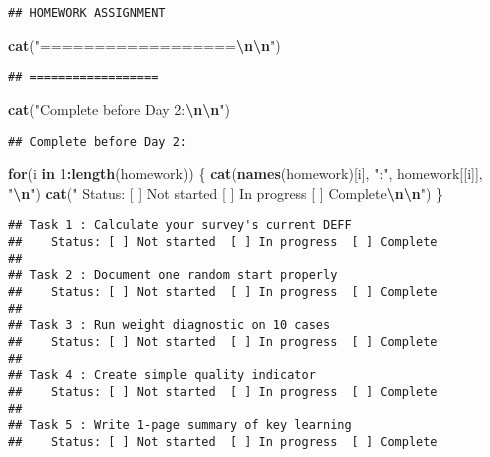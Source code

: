 \documentclass[
]{article}
\newenvironment{Shaded}{\begin{snugshade}}{\end{snugshade}}
\newcommand{\ControlFlowTok}[1]{\textcolor[rgb]{0.13,0.29,0.53}{\textbf{#1}}}
\newcommand{\DecValTok}[1]{\textcolor[rgb]{0.00,0.00,0.81}{#1}}
\newcommand{\FunctionTok}[1]{\textcolor[rgb]{0.13,0.29,0.53}{\textbf{#1}}}
\newcommand{\NormalTok}[1]{#1}
\newcommand{\SpecialCharTok}[1]{\textcolor[rgb]{0.81,0.36,0.00}{\textbf{#1}}}
\newcommand{\StringTok}[1]{\textcolor[rgb]{0.31,0.60,0.02}{#1}}
\begin{document}
\begin{verbatim}
## HOMEWORK ASSIGNMENT
\end{verbatim}

\begin{Shaded}
\begin{Highlighting}[]
\FunctionTok{cat}\NormalTok{(}\StringTok{"==================}\SpecialCharTok{\textbackslash{}n\textbackslash{}n}\StringTok{"}\NormalTok{)}
\end{Highlighting}
\end{Shaded}

\begin{verbatim}
## ==================
\end{verbatim}

\begin{Shaded}
\begin{Highlighting}[]
\FunctionTok{cat}\NormalTok{(}\StringTok{"Complete before Day 2:}\SpecialCharTok{\textbackslash{}n\textbackslash{}n}\StringTok{"}\NormalTok{)}
\end{Highlighting}
\end{Shaded}

\begin{verbatim}
## Complete before Day 2:
\end{verbatim}

\begin{Shaded}
\begin{Highlighting}[]
\ControlFlowTok{for}\NormalTok{(i }\ControlFlowTok{in} \DecValTok{1}\SpecialCharTok{:}\FunctionTok{length}\NormalTok{(homework)) \{}
  \FunctionTok{cat}\NormalTok{(}\FunctionTok{names}\NormalTok{(homework)[i], }\StringTok{":"}\NormalTok{, homework[[i]], }\StringTok{"}\SpecialCharTok{\textbackslash{}n}\StringTok{"}\NormalTok{)}
  \FunctionTok{cat}\NormalTok{(}\StringTok{"   Status: [ ] Not started  [ ] In progress  [ ] Complete}\SpecialCharTok{\textbackslash{}n\textbackslash{}n}\StringTok{"}\NormalTok{)}
\NormalTok{\}}
\end{Highlighting}
\end{Shaded}

\begin{verbatim}
## Task 1 : Calculate your survey's current DEFF 
##    Status: [ ] Not started  [ ] In progress  [ ] Complete
## 
## Task 2 : Document one random start properly 
##    Status: [ ] Not started  [ ] In progress  [ ] Complete
## 
## Task 3 : Run weight diagnostic on 10 cases 
##    Status: [ ] Not started  [ ] In progress  [ ] Complete
## 
## Task 4 : Create simple quality indicator 
##    Status: [ ] Not started  [ ] In progress  [ ] Complete
## 
## Task 5 : Write 1-page summary of key learning 
##    Status: [ ] Not started  [ ] In progress  [ ] Complete
\end{verbatim}
\end{document}
